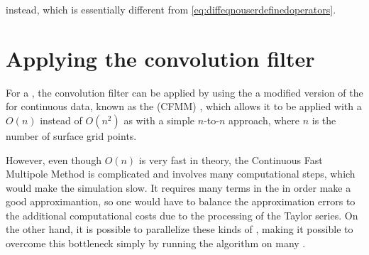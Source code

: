 instead, which is essentially different from \eqref{eq:diffeqnouserdefinedoperators}.

\section{Applying the convolution filter}

For a , the convolution filter can be applied by using the a modified version of the \FMM \citep{Greengard1985,Greengard1987} for continuous data, known as the  (CFMM) \citep{White1994}, which allows it to be applied with a $O(n)$   instead of $O(n^2)$ as with a simple $n$-to-$n$ approach, where $n$ is the number of surface grid points.

However, even though $O(n)$ is very fast in theory, the Continuous Fast Multipole Method is complicated and involves many computational steps, which would make the simulation slow. It requires many terms in the  in order make a good approximantion, so one would have to balance the approximation errors to the additional computational costs due to the processing of the Taylor series. On the other hand, it is possible to parallelize these kinds of  \citep[see e.g.][]{Board1994}, making it possible to overcome this bottleneck simply by running the algorithm on many .
